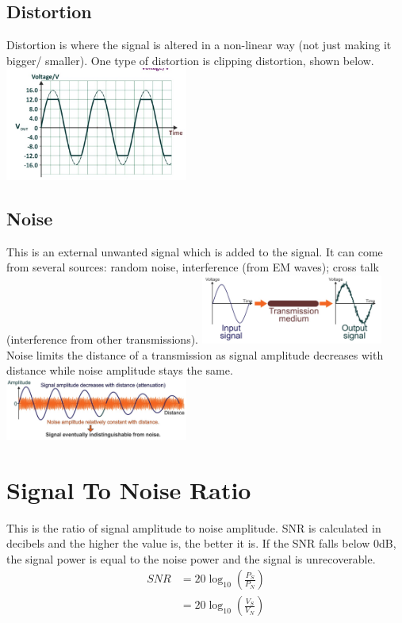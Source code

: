 \documentclass[a4paper,11pt, twocolumn]{article}
\begin{document}
\subsection{Distortion}
Distortion is where the signal is altered in a non-linear way (not just making it bigger/ smaller). One type of distortion is clipping distortion, shown below.
\includegraphics[width=0.45\textwidth]{clippingDistortion.jpg}
\subsection{Noise}
This is an external unwanted signal which is added to the signal. It can come from several sources: random noise, interference (from EM waves); cross talk (interference from other transmissions). 
\includegraphics[width=0.45\textwidth]{noise.jpg}
Noise limits the distance of a transmission as signal amplitude decreases with distance while noise amplitude stays the same.
\includegraphics[width=0.45\textwidth]{noiseSignalAmplitude.jpg}

\section{Signal To Noise Ratio}
This is the ratio of signal amplitude to noise amplitude. SNR is calculated in decibels and the higher the value is, the better it is. If the SNR falls below 0dB, the signal power is equal to the noise power and the signal is unrecoverable. 
\begin{align*}
    SNR & = 20\log_{10}\left(\frac{P_S}{P_N}\right)\\
    & = 20 \log_{10}\left(\frac{V_S}{V_N}\right)
\end{align*}
\end{document}
